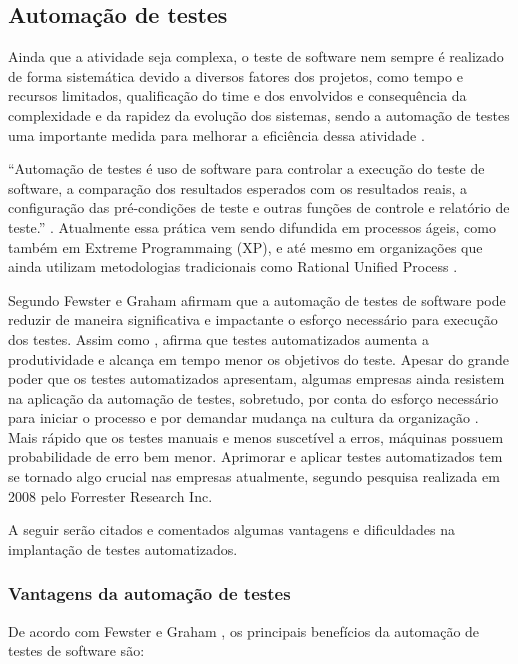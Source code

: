 \subsection{Automação de testes}

Ainda que a atividade seja complexa, o teste de software nem sempre é realizado de forma sistemática devido a diversos fatores dos projetos, como tempo e recursos limitados, qualificação do time e dos envolvidos e consequência da complexidade e da rapidez da evolução dos sistemas, sendo a automação de testes uma importante medida para melhorar a eficiência dessa atividade \cite{Fantinato2004}.

“Automação de testes é uso de software para controlar a execução do teste de software, a comparação dos resultados esperados com os resultados reais, a configuração das pré-condições de teste e outras funções de controle e relatório de teste.” \cite{Hooda2012}. Atualmente essa prática vem sendo difundida em processos ágeis, como também em Extreme Programmaing (XP), e até mesmo em organizações que ainda utilizam metodologias tradicionais como Rational Unified Process \cite{Lima2012}.

Segundo Fewster e Graham \cite{Fewster1999} afirmam que a automação de testes de software pode reduzir de maneira significativa e impactante o esforço necessário para execução dos testes. Assim como \cite{Molinari2010}, afirma que testes automatizados aumenta a produtividade e alcança em tempo menor os objetivos do teste. Apesar do grande poder que os testes automatizados apresentam, algumas empresas ainda resistem na aplicação da automação de testes, sobretudo, por conta do esforço necessário para iniciar o processo e por demandar mudança na cultura da organização \cite{Lima2012}. Mais rápido que os testes manuais e menos suscetível a erros, máquinas possuem probabilidade de erro bem menor. Aprimorar e aplicar testes automatizados tem se tornado algo crucial nas empresas atualmente, segundo pesquisa realizada em 2008 pelo Forrester Research Inc.

A seguir serão citados e comentados algumas vantagens e dificuldades na implantação de testes automatizados.

\subsubsection{Vantagens da automação de testes}

De acordo com Fewster e Graham \cite{Fewster1999}, os principais benefícios da automação de testes de software são:


